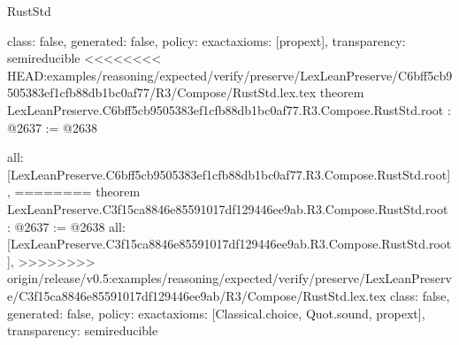 \begin{lexlean}{RustStd}
\begin{coremodule}
{\begin{coremodule}
{{{{  class: false,
  generated: false,
  policy: exact{axioms: [propext]},
  transparency: semireducible
}
<<<<<<<< HEAD:examples/reasoning/expected/verify/preserve/LexLeanPreserve/C6bff5cb9505383ef1cfb88db1bc0af77/R3/Compose/RustStd.lex.tex
theorem LexLeanPreserve.C6bff5cb9505383ef1cfb88db1bc0af77.R3.Compose.RustStd.root : @2637 := @2638 {
  all: [LexLeanPreserve.C6bff5cb9505383ef1cfb88db1bc0af77.R3.Compose.RustStd.root],
========
theorem LexLeanPreserve.C3f15ca8846e85591017df129446ee9ab.R3.Compose.RustStd.root : @2637 := @2638 {
  all: [LexLeanPreserve.C3f15ca8846e85591017df129446ee9ab.R3.Compose.RustStd.root],
>>>>>>>> origin/release/v0.5:examples/reasoning/expected/verify/preserve/LexLeanPreserve/C3f15ca8846e85591017df129446ee9ab/R3/Compose/RustStd.lex.tex
  class: false,
  generated: false,
  policy: exact{axioms: [Classical.choice, Quot.sound, propext]},
  transparency: semireducible
}

}}}}
\end{coremodule}}
\end{coremodule}
\end{lexlean}
